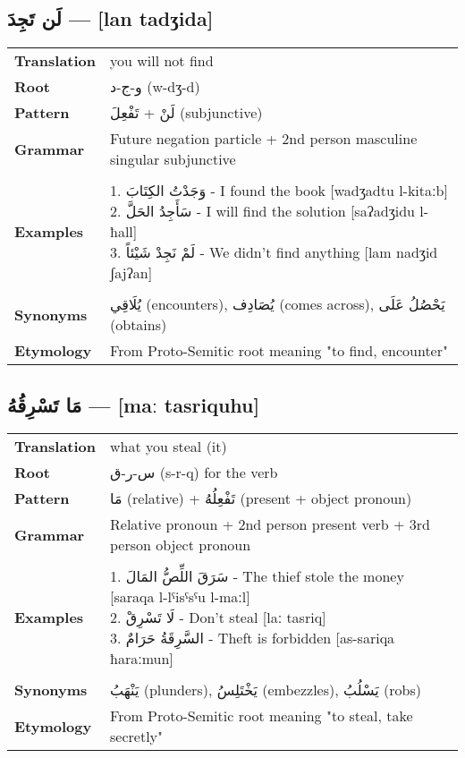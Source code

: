 \documentclass[letterpaper,12pt]{article}
\begin{document}
\subsection{\textarabic{لَن تَجِدَ} — [lan tadʒida]}

\begin{tabular}{p{3cm}p{10cm}}
\toprule
\textbf{Translation} & you will not find \\
\textbf{Root} & \textarabic{و-ج-د} (w-dʒ-d) \\
\textbf{Pattern} & \textarabic{لَنْ} + \textarabic{تَفْعِلَ} (subjunctive) \\
\textbf{Grammar} & Future negation particle + 2nd person masculine singular subjunctive \\
\midrule \\
\textbf{Examples} & \makecell[l]{\parbox{9.5cm}{
1. \textarabic{وَجَدْتُ الكِتَابَ} - I found the book [wadʒadtu l-kitaːb]\\
2. \textarabic{سَأَجِدُ الحَلَّ} - I will find the solution [saʔadʒidu l-ħall]\\
3. \textarabic{لَمْ نَجِدْ شَيْئاً} - We didn't find anything [lam nadʒid ʃajʔan]
}} \\
\midrule \\
\textbf{Synonyms} & \textarabic{يُلَاقِي} (encounters), \textarabic{يُصَادِف} (comes across), \textarabic{يَحْصُلُ عَلَى} (obtains) \\
\textbf{Etymology} & From Proto-Semitic root meaning "to find, encounter" \\
\bottomrule
\end{tabular}

\subsection{\textarabic{مَا تَسْرِقُهُ} — [maː tasriquhu]}

\begin{tabular}{p{3cm}p{10cm}}
\toprule
\textbf{Translation} & what you steal (it) \\
\textbf{Root} & \textarabic{س-ر-ق} (s-r-q) for the verb \\
\textbf{Pattern} & \textarabic{مَا} (relative) + \textarabic{تَفْعِلُهُ} (present + object pronoun) \\
\textbf{Grammar} & Relative pronoun + 2nd person present verb + 3rd person object pronoun \\
\midrule \\
\textbf{Examples} & \makecell[l]{\parbox{9.5cm}{
1. \textarabic{سَرَقَ اللِّصُّ المَالَ} - The thief stole the money [saraqa l-lˤisˤsˤu l-maːl]\\
2. \textarabic{لَا تَسْرِقْ} - Don't steal [laː tasriq]\\
3. \textarabic{السَّرِقَةُ حَرَامٌ} - Theft is forbidden [as-sariqa ħaraːmun]
}} \\
\midrule \\
\textbf{Synonyms} & \textarabic{يَنْهَبُ} (plunders), \textarabic{يَخْتَلِسُ} (embezzles), \textarabic{يَسْلُبُ} (robs) \\
\textbf{Etymology} & From Proto-Semitic root meaning "to steal, take secretly" \\
\bottomrule
\end{tabular}
\end{document}
